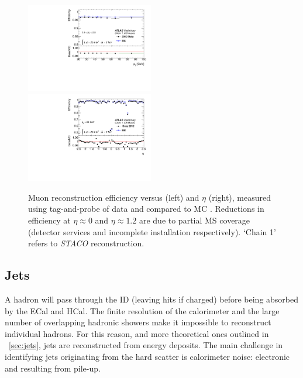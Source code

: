 \begin{description}
	\begin{figure}[t]
		\includegraphics[width=0.495\textwidth]{tex/selection/mu_recoeff_pt}
		\hfill
		\includegraphics[width=0.495\textwidth]{tex/selection/mu_recoeff_eta}
		\caption{Muon reconstruction efficiency versus \pt (left) and $\eta$ (right), 
		measured using tag-and-probe of \HepProcess{\PZ \HepTo \Pmu\Pmu} data and 
		compared to MC \cite{Muons:2012}. Reductions in efficiency at $\eta \approx 0$ 
		and $\eta \approx 1.2$ are due to partial MS coverage (detector services and 
		incomplete installation respectively). `Chain 1' refers to \textit{STACO} 
		reconstruction.}
		\label{fig:objects:mu_recoeff}
	\end{figure}

\end{description}



\subsection{Jets}
\label{sec:objects:jets}

A hadron will pass through the ID (leaving hits if charged) before being absorbed by 
the ECal and HCal. The finite resolution of the calorimeter and the 
large number of overlapping hadronic showers make it impossible to reconstruct individual 
hadrons. For this reason, and more theoretical ones outlined in \Section~\ref{sec:jets}, 
jets are reconstructed from energy deposits. The main challenge in identifying jets 
originating from the hard scatter is calorimeter noise: electronic and resulting from pile-up.

